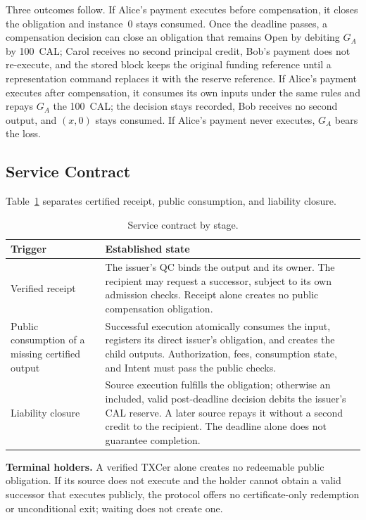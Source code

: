 Three outcomes follow. If Alice's payment executes before compensation, it closes the obligation and instance~0 stays consumed. Once the deadline passes, a compensation decision can close an obligation that remains Open by debiting $G_A$ by 100~CAL; Carol receives no second principal credit, Bob's payment does not re-execute, and the stored block keeps the original funding reference until a representation command replaces it with the reserve reference. If Alice's payment executes after compensation, it consumes its own inputs under the same rules and repays $G_A$ the 100~CAL; the decision stays recorded, Bob receives no second output, and $(x,0)$ stays consumed. If Alice's payment never executes, $G_A$ bears the loss.

\subsection{Service Contract}
\label{sec:model-contract}
Table~\ref{tab:model-contract} separates certified receipt, public
consumption, and liability closure.

\begin{table}[!t]
\caption{Service contract by stage.}
\label{tab:model-contract}
\centering\small
\begin{tabular}{@{}>{\raggedright\arraybackslash}p{}>{\raggedright\arraybackslash}p{}@{}}
\toprule
Trigger & Established state \\
\midrule
Verified receipt &
The issuer's QC binds the output and its owner. The recipient may
request a successor, subject to its own admission checks. Receipt
alone creates no public compensation obligation. \\
Public consumption of a missing certified output &
Successful execution atomically consumes the input, registers its
direct issuer's obligation, and creates the child outputs.
Authorization, fees, consumption state, and Intent must pass the
public checks. \\
Liability closure &
Source execution fulfills the obligation; otherwise an included,
valid post-deadline decision debits the issuer's CAL reserve.
A later source repays it without a second credit to the recipient.
The deadline alone does not guarantee completion. \\
\bottomrule
\end{tabular}
\end{table}

\noindent\textbf{Terminal holders.}
A verified TXCer alone creates no redeemable public obligation. If its source
does not execute and the holder cannot obtain a valid successor that executes
publicly, the protocol offers no certificate-only redemption or unconditional exit;
waiting does not create one.

